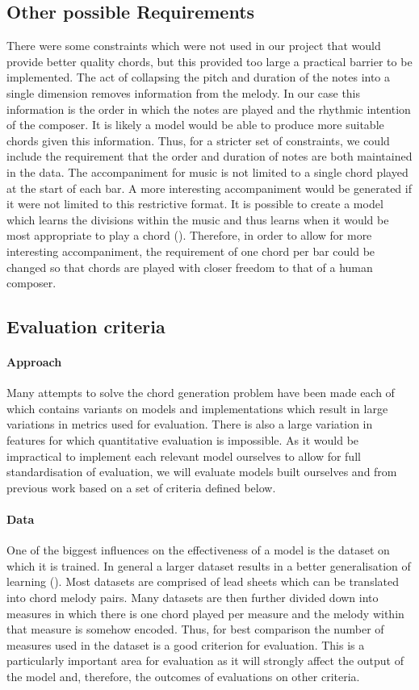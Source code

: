\subsection{Other possible Requirements}

There were some constraints which were not used in our project that would provide better quality chords, but this provided too large a practical barrier to be implemented.
The act of collapsing the pitch and duration of the notes into a single dimension removes information from the melody.
In our case this information is the order in which the notes are played and the rhythmic intention of the composer.
It is likely a model would be able to produce more suitable chords given this information.
Thus, for a stricter set of constraints, we could include the requirement that the order and duration of notes are both maintained in the data.
The accompaniment for music is not limited to a single chord played at the start of each bar.
A more interesting accompaniment would be generated if it were not limited to this restrictive format.
It is possible to create a model which learns the divisions within the music and thus learns when it would be most appropriate to play a chord (\cite{ReinforcementLearning}).
Therefore, in order to allow for more interesting accompaniment, the requirement of one chord per bar could be changed so that chords are played with closer freedom to that of a human composer.

\subsection{Evaluation criteria}
\paragraph{Approach}
Many attempts to solve the chord generation problem have been made each of which contains variants on models and implementations which result in large variations in metrics used for evaluation.
There is also a large variation in features for which quantitative evaluation is impossible. 
As it would be impractical to implement each relevant model ourselves to allow for full standardisation of evaluation, we will evaluate models built ourselves and from previous work based on a set of criteria defined below.
\paragraph{Data}
One of the biggest influences on the effectiveness of a model is the dataset on which it is trained. 
In general a larger dataset results in a better generalisation of learning (\cite{UnreasonableEffectivenessOfData}).
Most datasets are comprised of lead sheets which can be translated into chord melody pairs.
Many datasets are then further divided down into measures in which there is one chord played per measure and the melody within that measure is somehow encoded.
Thus, for best comparison the number of measures used in the dataset is a good criterion for evaluation.
This is a particularly important area for evaluation as it will strongly affect the output of the model and, therefore, the outcomes of evaluations on other criteria.


